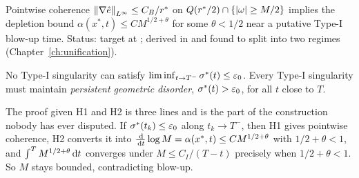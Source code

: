 \begin{statement}
\label{st:h2}
Pointwise coherence \(\left\|\nabla\hat{e}\right\|_{L^\infty}\le C_B/r^{*}\) on
\(Q(r^{*}/2)\cap\{\left|\omega\right|\ge M/2\}\) implies the depletion bound
\(\alpha(x^*,t)\le C M^{1/2+\theta}\) for some \(\theta<1/2\) near a putative
Type-I blow-up time. Status: \OPEN{} target at ; derived in  and
found to split into two regimes (Chapter~\ref{ch:unification}).
\end{statement}

\begin{statement}
\label{st:pincer}
 No Type-I singularity can satisfy
\(\liminf_{t\to T^-}\sigma^{*}(t)\le\varepsilon_0\). Every Type-I singularity must
maintain \emph{persistent geometric disorder}, \(\sigma^{*}(t)>\varepsilon_0\), for
all \(t\) close to \(T\).
\end{statement}

The proof given H1 and H2 is three lines and is the part of the construction
nobody has ever disputed. If \(\sigma^{*}(t_k)\le\varepsilon_0\) along
\(t_k\to T^-\), then H1 gives pointwise coherence, H2 converts it into
\(\tfrac{\,\mathrm{d}}{\,\mathrm{d} t}\log M=\alpha(x^*,t)\le CM^{1/2+\theta}\) with
\(1/2+\theta<1\), and \(\int^T M^{1/2+\theta}\,\mathrm{d} t\) converges under
\(M\le C_I/(T-t)\) precisely when \(1/2+\theta<1\). So \(M\) stays bounded,
contradicting blow-up.

